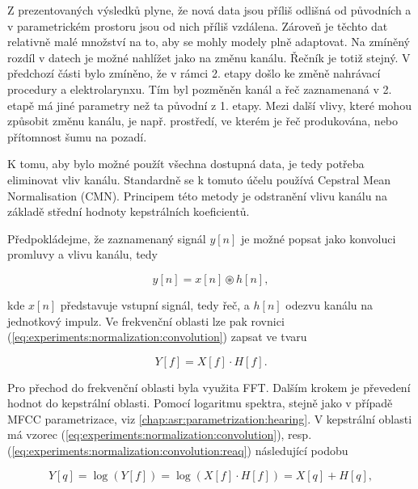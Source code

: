 Z prezentovaných výsledků plyne, že nová data jsou příliš odlišná od původních a v parametrickém prostoru jsou od nich příliš vzdálena.
Zároveň je těchto dat relativně malé množství na to, aby se mohly modely plně adaptovat.
Na zmíněný rozdíl v datech je možné nahlížet jako na změnu kanálu.
Řečník je totiž stejný.
V předchozí části bylo zmíněno, že v rámci 2. etapy došlo ke změně nahrávací procedury a elektrolarynxu.
Tím byl pozměněn kanál a řeč zaznamenaná v 2. etapě  má jiné parametry než ta původní z 1. etapy.
Mezi další vlivy, které mohou způsobit změnu kanálu, je např. prostředí, ve kterém je řeč produkována, nebo přítomnost šumu na pozadí.

K tomu, aby bylo možné použít všechna dostupná data, je tedy potřeba eliminovat vliv kanálu.
Standardně se k tomuto účelu používá Cepstral Mean Normalisation (CMN). Principem této metody je odstranění vlivu kanálu na základě střední hodnoty kepstrálních koeficientů.

Předpokládejme, že zaznamenaný signál $y[n]$ je možné popsat jako konvoluci promluvy a vlivu kanálu, tedy

\begin{equation}
  y\left[n\right] = x\left[n\right] \circledast h\left[n\right],
  \label{eq:experiments:normalization:convolution}
\end{equation}

\noindent kde $x\left[n\right]$ představuje vstupní signál, tedy řeč, a $h\left[n\right]$ odezvu kanálu na jednotkový impulz.
Ve frekvenční oblasti lze pak rovnici (\ref{eq:experiments:normalization:convolution}) zapsat ve tvaru

\begin{equation}
  Y\left[f\right] = X\left[f\right] \cdot H\left[f\right].
  \label{eq:experiments:normalization:convolution:reaq}
\end{equation}

\noindent Pro přechod do frekvenční oblasti byla využita FFT.
Dalším krokem je převedení hodnot do kepstrální oblasti.
Pomocí logaritmu spektra, stejně jako v případě MFCC parametrizace, viz \ref{chap:asr:parametrization:hearing}. V kepstrální oblasti má vzorec (\ref{eq:experiments:normalization:convolution}), resp. (\ref{eq:experiments:normalization:convolution:reaq}) následující podobu

\begin{equation}
  Y\left[q\right] = \log\left(Y\left[f\right]\right) = \log\left(X\left[f\right] \cdot H\left[f\right]\right) = X\left[q\right] + H\left[q\right],
\end{equation}

